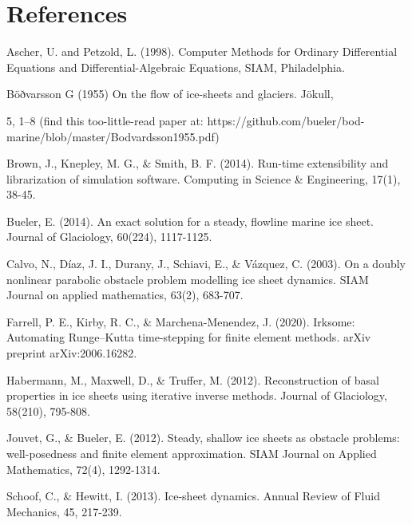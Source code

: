 \documentclass{article}
\theoremstyle{definition}
\theoremstyle{plain}
\begin{document}
\section*{References}

Ascher, U. and Petzold, L. (1998). Computer Methods for Ordinary Differential Equations and Differential-Algebraic Equations, SIAM, Philadelphia.

Böðvarsson G (1955) On the flow of ice-sheets and glaciers. Jökull,

5, 1–8 (find this too-little-read paper at: https://github.com/bueler/bod-marine/blob/master/Bodvardsson1955.pdf)

Brown, J., Knepley, M. G., \& Smith, B. F. (2014). Run-time extensibility and librarization of simulation software. Computing in Science \& Engineering, 17(1), 38-45.

Bueler, E. (2014). An exact solution for a steady, flowline marine ice sheet. Journal of Glaciology, 60(224), 1117-1125.

Calvo, N., Díaz, J. I., Durany, J., Schiavi, E., \& Vázquez, C. (2003). On a doubly nonlinear parabolic obstacle problem modelling ice sheet dynamics. SIAM Journal on applied mathematics, 63(2), 683-707.

Farrell, P. E., Kirby, R. C., \& Marchena-Menendez, J. (2020). Irksome: Automating Runge--Kutta time-stepping for finite element methods. arXiv preprint arXiv:2006.16282.

Habermann, M., Maxwell, D., \& Truffer, M. (2012). Reconstruction of basal properties in ice sheets using iterative inverse methods. Journal of Glaciology, 58(210), 795-808.

Jouvet, G., \& Bueler, E. (2012). Steady, shallow ice sheets as obstacle problems: well-posedness and finite element approximation. SIAM Journal on Applied Mathematics, 72(4), 1292-1314.

Schoof, C., \& Hewitt, I. (2013). Ice-sheet dynamics. Annual Review of Fluid Mechanics, 45, 217-239.
\end{document}
